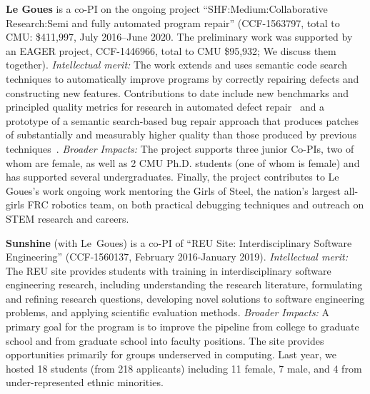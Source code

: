 \vspace{0.5ex}
\noindent\textbf{Le Goues} is a co-PI on the ongoing project
``SHF:Medium:Collaborative Research:Semi and fully automated program repair''
(CCF-1563797, total to CMU: \$411,997, July 2016--June 2020. The preliminary
work was supported by an EAGER project, CCF-1446966, total
to CMU \$95,932; We discuss them together). \emph{Intellectual merit:} The
work extends and uses semantic code search techniques to
automatically improve programs by correctly repairing defects and constructing new
features. Contributions to date include new
benchmarks and principled quality metrics for research in automated defect
repair~\cite{LeGoues15tse,Smith15fse} and a prototype of a semantic
search-based bug repair approach that produces patches of
substantially and measurably higher quality than those produced by previous
techniques~\cite{Ke15ase}.  \emph{Broader Impacts:}  The
project supports three junior Co-PIs, two of whom are female, as well as 2 CMU
Ph.D. students (one of whom is female) and has supported several undergraduates.
Finally, the project contributes to Le Goues's work ongoing work mentoring
the Girls of Steel, the nation's largest all-girls FRC robotics team, on both
practical debugging techniques and outreach on STEM research and careers.

\vspace{0.5ex}
\noindent\textbf{Sunshine} (with Le~Goues) is a co-PI of ``REU Site: Interdisciplinary Software 
Engineering'' (CCF-1560137, February 2016-January 2019). \emph{Intellectual merit:} The REU site 
provides students with training in interdisciplinary software engineering research, including 
understanding the research literature, formulating and refining research questions, developing 
novel solutions to software engineering problems, and applying scientific evaluation methods. 
\emph{Broader Impacts:} A primary goal for the program is to improve the pipeline from college 
to graduate school and from graduate school into faculty positions. The site provides opportunities 
primarily for groups underserved in computing. Last year, we hosted 18 students (from 218 applicants) 
including 11 female, 7 male, and 4 from under-represented ethnic minorities.


